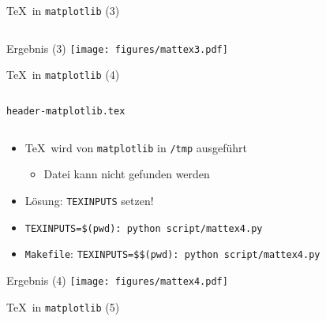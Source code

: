 \begin{frame}[fragile]{\TeX\ in \texttt{matplotlib} (3)}
  \inputminted{python}{script/mattex3.py}
\end{frame}

\AddToShipoutPictureFG*{\ShowFramePicture}
\begin{frame}{Ergebnis (3)}%
  \centering%
  \texttt{[image: figures/mattex3.pdf]}%
\end{frame}

\begin{frame}[fragile]{\TeX\ in \texttt{matplotlib} (4)}
  \inputminted{python}{script/mattex4.py}
\end{frame}

\begin{frame}[fragile]{\texttt{header-matplotlib.tex}}
  \inputminted{latex}{header-matplotlib.tex}

  \vspace*{-0.5em}
  \begin{itemize}
    \item \TeX\ wird von \texttt{matplotlib} in \texttt{/tmp} ausgeführt
      \begin{itemize}
        \item Datei kann nicht gefunden werden
      \end{itemize}
    \item Lösung: \texttt{TEXINPUTS} setzen!
    \item \texttt{TEXINPUTS=\$(pwd): python script/mattex4.py}
    \item \texttt{Makefile}: \texttt{TEXINPUTS=\$\$(pwd): python script/mattex4.py}
  \end{itemize}
  \vspace*{-1em}
\end{frame}

%

\AddToShipoutPictureFG*{\ShowFramePicture}
\begin{frame}{Ergebnis (4)}
  \centering
  \texttt{[image: figures/mattex4.pdf]}
\end{frame}

\begin{frame}[fragile]{\TeX\ in \texttt{matplotlib} (5)}
  \inputminted{python}{script/mattex5.py}
\end{frame}

